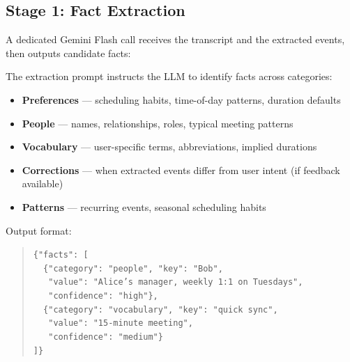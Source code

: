 \documentclass[11pt, letterpaper]{article}
\begin{document}
\subsection{Stage 1: Fact Extraction}

A dedicated Gemini Flash call receives the transcript and the extracted events,
then outputs candidate facts:

\begin{center}
\end{center}

\noindent The extraction prompt instructs the LLM to identify facts across categories:

\begin{itemize}[leftmargin=2em]
    \item \textbf{Preferences} --- scheduling habits, time-of-day patterns, duration defaults
    \item \textbf{People} --- names, relationships, roles, typical meeting patterns
    \item \textbf{Vocabulary} --- user-specific terms, abbreviations, implied durations
    \item \textbf{Corrections} --- when extracted events differ from user intent (if feedback available)
    \item \textbf{Patterns} --- recurring events, seasonal scheduling habits
\end{itemize}

\noindent Output format:
\begin{quote}
\small
\texttt{\{"facts": [}\\
\texttt{~~\{"category": "people", "key": "Bob",}\\
\texttt{~~~"value": "Alice's manager, weekly 1:1 on Tuesdays",}\\
\texttt{~~~"confidence": "high"\},}\\
\texttt{~~\{"category": "vocabulary", "key": "quick sync",}\\
\texttt{~~~"value": "15-minute meeting",}\\
\texttt{~~~"confidence": "medium"\}}\\
\texttt{]\}}
\end{quote}
\end{document}
